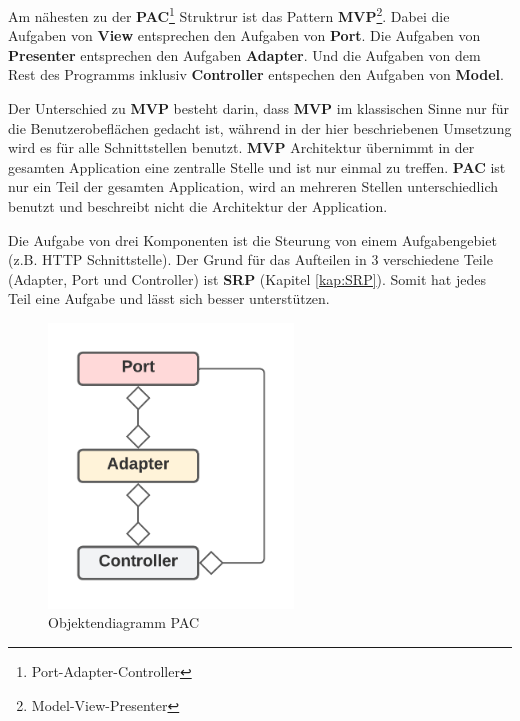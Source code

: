 Am nähesten zu der \textbf{PAC}\footnote{Port-Adapter-Controller} Struktrur 
ist das Pattern \textbf{MVP}\footnote{Model-View-Presenter}.
Dabei die Aufgaben von \textbf{View} entsprechen den Aufgaben von \textbf{Port}. 
Die Aufgaben von \textbf{Presenter} entsprechen den Aufgaben \textbf{Adapter}.
Und die Aufgaben von dem Rest des Programms inklusiv \textbf{Controller} entspechen den Aufgaben von \textbf{Model}.

Der Unterschied zu \textbf{MVP} besteht darin, dass \textbf{MVP} im klassischen Sinne nur für die Benutzerobeflächen gedacht ist,
während in der hier beschriebenen Umsetzung wird es für alle Schnittstellen benutzt.
\textbf{MVP} Architektur übernimmt in der gesamten Application eine zentralle Stelle und ist nur einmal zu treffen.
\textbf{PAC} ist nur ein Teil der gesamten Application, wird an mehreren Stellen unterschiedlich benutzt und beschreibt nicht 
die Architektur der Application.

Die Aufgabe von drei Komponenten ist die Steurung von einem Aufgabengebiet (z.B. HTTP Schnittstelle).
Der Grund für das Aufteilen in 3 verschiedene Teile (Adapter, Port und Controller) ist
\textbf{SRP} (Kapitel \ref{kap:SRP}). Somit hat jedes Teil eine Aufgabe und lässt sich besser 
unterstützen. 


\begin{figure}[H]
   \centering
   \includegraphics[width=6.5cm]{./images/Port-Adapter-Contoller.png}
    \caption[Objektendiagramm PAC]{Objektendiagramm PAC}
    \label{fig:CDPAC}
\end{figure}